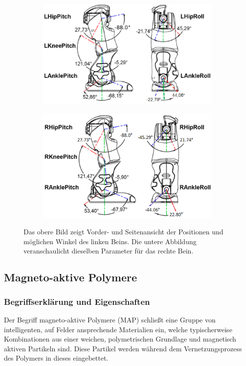 \begin{figure}[tb]
	\hfill
	\begin{subfigure}[c]{\linewidth}
		\centering
		\includegraphics[width=0.7\linewidth]{Bilder/hardware_llegjoint.png}
	\end{subfigure}
	\begin{subfigure}[c]{\linewidth}
		\centering
		\includegraphics[width=0.7\linewidth]{Bilder/hardware_rlegjoint.png}
	\end{subfigure}
	\hfill
	\caption{Das obere Bild zeigt Vorder- und Seitenansicht der Positionen und möglichen Winkel des linken Beins. Die untere Abbildung veranschaulicht dieselben Parameter für das rechte Bein. \cite[in /kinematics-data/joints]{nao_docu_dev_guide}}
	\label{hardware_legjoint}
\end{figure}


\FloatBarrier
\subsection{Magneto-aktive Polymere}\label{kap_MAP}
\subsubsection{Begriffserklärung und Eigenschaften}
Der Begriff magneto-aktive Polymere (MAP) schließt eine Gruppe von intelligenten, auf Felder ansprechende Materialien ein, welche typischerweise Kombinationen aus einer weichen, polymetrischen Grundlage und magnetisch aktiven Partikeln sind. Diese Partikel werden während dem Vernetzungsprozess des Polymers in dieses eingebettet. 

